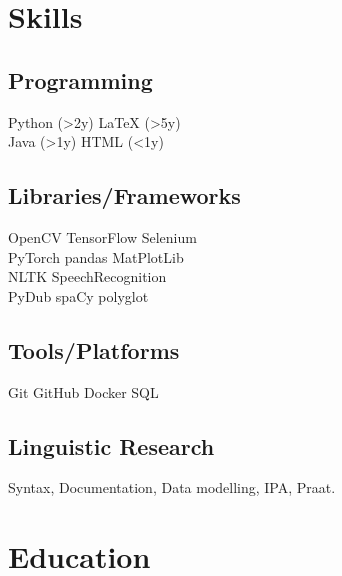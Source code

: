 \documentclass[]{plushcv}
\begin{document}
\begin{minipage}[t]{0.25\textwidth} 


\section{Skills}
\subsection{Programming}
\sectionsep
{} 
Python (>2y) \textbullet{} LaTeX (>5y)  \\
\sectionsep
{}
Java (>1y) \textbullet{}  HTML (<1y) \\
\sectionsep
\subsection{Libraries/Frameworks}
\sectionsep
OpenCV \textbullet{} TensorFlow \textbullet{} Selenium\\
PyTorch \textbullet{} pandas \textbullet{} MatPlotLib \\
NLTK \textbullet{} SpeechRecognition \textbullet{} \\ 
PyDub \textbullet{} spaCy \textbullet{} polyglot
\sectionsep
\subsection{Tools/Platforms}
\sectionsep
Git \textbullet{} GitHub \textbullet{} Docker \textbullet{} SQL \\
\sectionsep
\subsection{Linguistic Research}
\sectionsep
Syntax, Documentation, Data modelling, IPA, Praat.
\sectionsep


\section{Education} 



\end{minipage}
\end{document}
